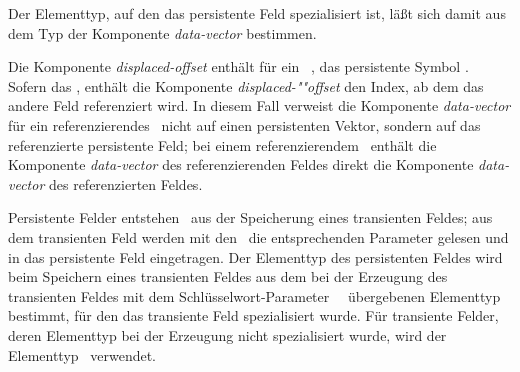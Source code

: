 Der Elementtyp, auf den das persistente Feld spezialisiert ist,
l\"{a}\ss{}t sich damit aus dem Typ der Komponente {\em data-vector\/}
bestimmen.
%
\par{}Die Komponente {\em displaced-offset\/} enth\"{a}lt 
f\"{u}r ein \ ,
das persistente Symbol \lispnil. Sofern das , enth\"{a}lt
die Komponente {\em dis\-pla\-ced-""off\-set\/} den Index, ab dem das
andere Feld referenziert wird. In diesem Fall verweist die Komponente
{\em data-vector\/} f\"{u}r ein referenzierendes \ nicht auf einen persistenten Vektor,
sondern auf das referenzierte persistente Feld; bei einem
referenzierendem \ enth\"{a}lt die Komponente
{\em data-vector\/} des referenzierenden Feldes direkt die Komponente
{\em data-vector\/} des referenzierten Feldes.
%
\par{}Persistente Felder entstehen \ia\ aus der Speicherung
eines transienten Feldes; aus dem transienten Feld werden mit den
\ die
entsprechenden Parameter gelesen und in das persistente Feld
eingetragen.  Der Elementtyp des persistenten Feldes
wird beim Speichern eines transienten Feldes aus dem bei der Erzeugung
des transienten Feldes mit dem Schl\"{u}sselwort-Parameter
\ \ \"{u}bergebenen Elementtyp bestimmt,
f\"{u}r den das transiente Feld spezialisiert wurde. F\"{u}r transiente
Felder, deren Elementtyp bei der Erzeugung nicht spezialisiert wurde,
wird der Elementtyp \lispt\ verwendet.
%
